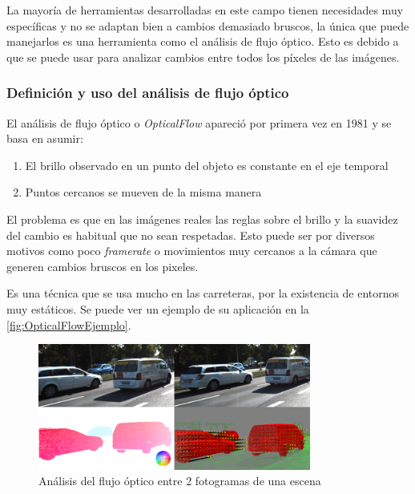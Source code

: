 La mayoría de herramientas desarrolladas en este campo tienen necesidades muy específicas y no se adaptan bien a cambios demasiado bruscos, la única que puede manejarlos es una herramienta como el análisis de flujo óptico. 
Esto es debido a que se puede usar para analizar cambios entre todos los píxeles de las imágenes.

\subsubsection{Definición y uso del análisis de flujo óptico}

El análisis de flujo óptico o \textit{OpticalFlow} apareció por primera vez en 1981\cite{hornDeterminingOpticalFlow1981} y se basa en asumir:

\begin{enumerate}
    \item El brillo observado en un punto del objeto es constante en el eje temporal
    \item Puntos cercanos se mueven de la misma manera
\end{enumerate}

El problema es que en las imágenes reales las reglas sobre el brillo y la suavidez del cambio es habitual que no sean respetadas. Esto puede ser por diversos motivos como poco \textit{framerate} o movimientos 
muy cercanos a la cámara que generen cambios bruscos en los pixeles.

Es una técnica que se usa mucho en las carreteras, por la existencia de entornos muy estáticos. Se puede ver un ejemplo de su aplicación en la \autoref{fig:OpticalFlowEjemplo}.

\begin{figure}[H]
    \centering
    \includegraphics[width=0.8\textwidth]{images/4/OpticalFlow.png}
    \caption{Análisis del flujo óptico entre 2 fotogramas de una escena\cite{schusterCombiningStereoDisparity2018}}
    \label{fig:OpticalFlowEjemplo}
\end{figure}

